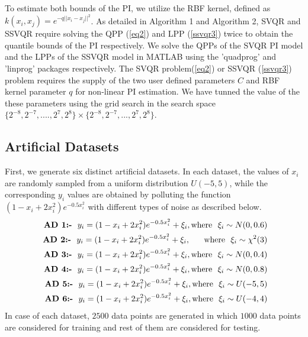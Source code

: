 \documentclass[10pt]{article} %
\begin{document}
To estimate both bounds of the PI, we utilize the RBF kernel, defined as \( k(x_i, x_j) = e^{-q||x_i - x_j||^2} \). As detailed in Algorithm 1 and Algorithm 2, SVQR and SSVQR require solving the QPP (\ref{eq2}) and LPP (\ref{ssvqr3}) twice to obtain the quantile bounds of the PI respectively. We solve the QPPs of the SVQR PI model and the LPPs of the SSVQR model in MATLAB using the 'quadprog' and 'linprog' packages respectively. The SVQR problem(\ref{eq2}) or  SSVQR (\ref{ssvqr3}) problem requires the supply of the two user defined parameters $C$ and  RBF kernel parameter $q$ for non-linear PI estimation. We have tunned the value of the these parameters using the grid search in the search space $\{2 ^{-8},2^{-7},....,2^7,2^8 \} \times \{2 ^{-8},2^{-7},...,2^7,2^8 \} $. 

\subsection{Artificial Datasets}
First, we generate six distinct artificial datasets. In each dataset, the values of \( x_i \) are randomly sampled from a uniform distribution \( U(-5,5) \), while the corresponding \( y_i \) values are obtained by polluting  the function  
$
(1 - x_i + 2x_i^2) e^{-0.5 x_i^2}
$ 
 with different types of noise as described below.
\begin{eqnarray}
    \mbox{ \textbf{AD 1:-}} ~~y_i = (1 - x_i + 2x_i^2) e^{-0.5 x_i^2} + \xi_i , \mbox{where~~}  \xi_i \sim N(0, 0.6) \nonumber \\
    \mbox{ \textbf{AD 2:-}} ~~y_i = (1 - x_i + 2x_i^2) e^{-0.5 x_i^2} + \xi_i , ~~~~~\mbox{where~~}  \xi_i \sim \chi^2(3) \nonumber \\
    \mbox{ \textbf{AD 3:-}} ~~y_i = (1 - x_i + 2x_i^2) e^{-0.5 x_i^2} + \xi_i , \mbox{where~~}  \xi_i \sim N(0, 0.4) \nonumber \\
    \mbox{ \textbf{AD 4:-}} ~~y_i = (1 - x_i + 2x_i^2) e^{-0.5 x_i^2} + \xi_i , \mbox{where~~}  \xi_i \sim N(0, 0.8) \nonumber \\
    \mbox{ \textbf{AD 5:-}} ~~y_i = (1 - x_i + 2x_i^2) e^{-0.5 x_i^2} + \xi_i , \mbox{where~~}  \xi_i \sim U(-5, 5) \nonumber \\
     \mbox{ \textbf{AD 6:-}} ~~y_i = (1 - x_i + 2x_i^2) e^{-0.5 x_i^2} + \xi_i , \mbox{where~~}  \xi_i \sim U(-4, 4) \nonumber 
\end{eqnarray}
In case of each dataset, $2500$ data points are generated in which $1000$ data points are considered for training and rest of them are considered for testing.
\end{document}
